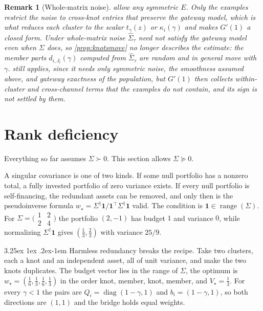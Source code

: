 \documentclass[11pt]{article}
\makeatletter
\renewcommand\paragraph{\@startsection{paragraph}{4}{\z@}%
  {3.25ex \@plus1ex \@minus.2ex}{-1em}%
  {\normalfont\normalsize\itshape}}
\newcommand{\ones}{\mathbf{1}}
\newtheorem{remark}{Remark}
\makeatother
\begin{document}
\begin{remark}[Whole-matrix noise]
\label{rem:wholematrix}
 allow any symmetric $E$. Only the
examples restrict the noise to cross-knot entries that preserve the gateway
model, which is what reduces each cluster to the scalar $t_\gamma(z)$ or
$\kappa_i(\gamma)$ and makes $G'(1)$ a closed form. Under whole-matrix
noise $\widehat\Sigma_\tau$ need not satisfy the gateway model even when
$\Sigma$ does, so \cref{prop:knotsmove} no longer describes the estimate:
the member parts $d_{i,J_i}(\gamma)$ computed from $\widehat\Sigma_\tau$
are random and in general move with $\gamma$.  still
applies, since it needs only symmetric noise, the smoothness assumed above,
and gateway exactness of the population, but $G'(1)$ then collects
within-cluster and cross-channel terms that the examples do not contain,
and its sign is not settled by them.
\end{remark}

\section{Rank deficiency}
\label{sec:rank}

Everything so far assumes $\Sigma\succ0$. This section allows
$\Sigma\succeq0$.

A singular covariance is one of two kinds. If some null portfolio has a
nonzero total, a fully invested portfolio of zero variance exists. If every
null portfolio is self-financing, the redundant assets can be removed, and
only then is the pseudoinverse formula
$w_\star=\Sigma^\dagger\ones/\ones^\top\Sigma^\dagger\ones$ valid. The
condition is $\ones\in\operatorname{range}(\Sigma)$. For
$\Sigma=\big(\begin{smallmatrix}1&2\\2&4\end{smallmatrix}\big)$ the
portfolio $(2,-1)$ has budget $1$ and variance $0$, while normalizing
$\Sigma^\dagger\ones$ gives $(\tfrac13,\tfrac23)$ with variance $25/9$.

\paragraph{Harmless redundancy breaks the recipe.} Take two clusters, each a
knot and an independent asset, all of unit variance, and make the two knots
duplicates. The budget vector lies in the range of $\Sigma$, the optimum is
$w_\star=(\tfrac16,\tfrac13,\tfrac16,\tfrac13)$ in the order knot, member,
knot, member, and $V_\star=\tfrac13$. For every $\gamma<1$ the pairs are
$Q_i=\operatorname{diag}(1-\gamma,1)$ and $b_i=(1-\gamma,1)$, so both
directions are $(1,1)$ and the bridge holds equal weights.
\end{document}

